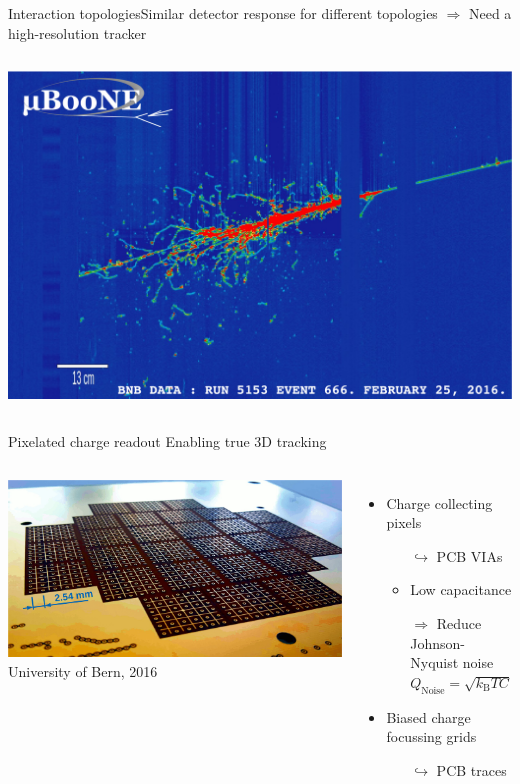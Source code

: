 \documentclass[]{beamer}
\newcommand*{\m}{\mathrm}
\newcommand*{\emphcol}{red}
\newcommand*{\emphcoltitle}{blue}
\begin{document}
\begin{frame}{Interaction topologies}{Similar detector response for different topologies $\Rightarrow$ {\color{\emphcol} Need a high-resolution tracker}}
\begin{columns}[c]
		\includegraphics[width=\textwidth]{defence/uboone_em-shower}
	\end{columns}
\end{frame}

\begin{frame}{Pixelated charge readout}{\color{\emphcoltitle} Enabling true 3D tracking}
	\begin{columns}[c]
		\centering
		\includegraphics[width=\textwidth]{viper/pixies}\\
		{\tiny University of Bern, 2016}\\
		\begin{itemize}
			\item Charge collecting pixels
			\begin{itemize}
				\item[$\hookrightarrow$] PCB VIAs
				\item Low capacitance
				\item[$\Rightarrow$] Reduce Johnson-Nyquist noise $Q_{\m{Noise}} = \sqrt{k_{\m{B}}TC}$
			\end{itemize}
			\item Biased charge focussing grids
			\begin{itemize}
				\item[$\hookrightarrow$] PCB traces
			\end{itemize}
		\end{itemize}
	\end{columns}
\end{frame}
\end{document}
